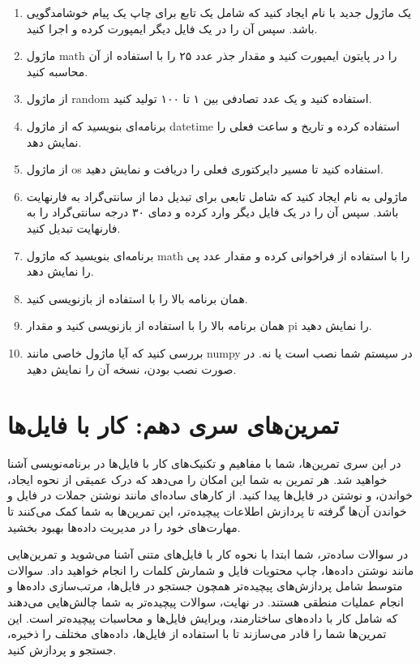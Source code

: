 \documentclass[b5paper,12pt]{article}
\begin{document}
	\begin{enumerate}
		\item یک ماژول جدید با نام  ایجاد کنید که شامل یک تابع برای چاپ یک پیام خوشامدگویی باشد. سپس آن را در یک فایل دیگر ایمپورت کرده و اجرا کنید.
		\item ماژول math را در پایتون ایمپورت کنید و مقدار جذر عدد ۲۵ را با استفاده از آن محاسبه کنید.
		\item از ماژول random استفاده کنید و یک عدد تصادفی بین ۱ تا ۱۰۰ تولید کنید.
		\item برنامه‌ای بنویسید که از ماژول datetime استفاده کرده و تاریخ و ساعت فعلی را نمایش دهد.
		\item از ماژول os استفاده کنید تا مسیر دایرکتوری فعلی را دریافت و نمایش دهید.
		\item ماژولی به نام  ایجاد کنید که شامل تابعی برای تبدیل دما از سانتی‌گراد به فارنهایت باشد. سپس آن را در یک فایل دیگر وارد کرده و دمای ۳۰ درجه سانتی‌گراد را به فارنهایت تبدیل کنید.
		\item برنامه‌ای بنویسید که ماژول math را با استفاده از  فراخوانی کرده و مقدار عدد پی را نمایش دهد.
		\item همان برنامه بالا را با استفاده از  بازنویسی کنید.
		\item همان برنامه بالا را با استفاده از  بازنویسی کنید و مقدار pi را نمایش دهید.
		\item بررسی کنید که آیا ماژول خاصی مانند numpy در سیستم شما نصب است یا نه. در صورت نصب بودن، نسخه آن را نمایش دهید.
	\end{enumerate}
	
	\newpage
	\section*{تمرین‌های سری دهم: کار با فایل‌ها}
	در این سری تمرین‌ها، شما با مفاهیم و تکنیک‌های کار با فایل‌ها در برنامه‌نویسی آشنا خواهید شد. هر تمرین به شما این امکان را می‌دهد که درک عمیقی از نحوه ایجاد، خواندن، و نوشتن در فایل‌ها پیدا کنید. از کارهای ساده‌ای مانند نوشتن جملات در فایل و خواندن آن‌ها گرفته تا پردازش اطلاعات پیچیده‌تر، این تمرین‌ها به شما کمک می‌کنند تا مهارت‌های خود را در مدیریت داده‌ها بهبود بخشید.

	در سوالات ساده‌تر، شما ابتدا با نحوه کار با فایل‌های متنی آشنا می‌شوید و تمرین‌هایی مانند نوشتن داده‌ها، چاپ محتویات فایل و شمارش کلمات را انجام خواهید داد. سوالات متوسط شامل پردازش‌های پیچیده‌تر همچون جستجو در فایل‌ها، مرتب‌سازی داده‌ها و انجام عملیات منطقی هستند. در نهایت، سوالات پیچیده‌تر به شما چالش‌هایی می‌دهند که شامل کار با داده‌های ساختارمند، ویرایش فایل‌ها و محاسبات پیچیده‌تر است. این تمرین‌ها شما را قادر می‌سازند تا با استفاده از فایل‌ها، داده‌های مختلف را ذخیره، جستجو و پردازش کنید.
	
\end{document}
